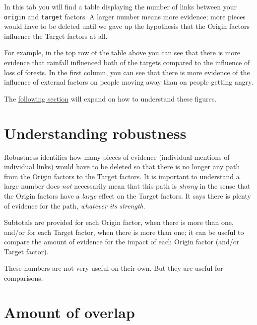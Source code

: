\documentclass[
]{book}
\begin{document}
In this tab you will find a table displaying the number of links between your \texttt{origin} and \texttt{target} factors. A larger number means more evidence; more pieces would have to be deleted until we gave up the hypothesis that the Origin factors influence the Target factors at all.

For example, in the top row of the table above you can see that there is more evidence that rainfall influenced both of the targets compared to the influence of loss of forests. In the first column, you can see that there is more evidence of the influence of external factors on people moving away than on people getting angry.

The \protect\hyperlink{howtoanalyseobustness}{following section} will expand on how to understand these figures.

\hypertarget{analysingrobustness}{%
\section{Understanding robustness}\label{analysingrobustness}}

Robustness identifies how many pieces of evidence (individual mentions of individual links) would have to be deleted so that there is no longer any path from the Origin factors to the Target factors. It is important to understand a large number does \emph{not} necessarily mean that this path is \emph{strong} in the sense that the Origin factors have a \emph{large} effect on the Target factors. It says there is plenty of evidence for the path, \emph{whatever its strength}.

Subtotals are provided for each Origin factor, when there is more than one, and/or for each Target factor, when there is more than one; it can be useful to compare the amount of evidence for the impact of each Origin factor (and/or Target factor).

These numbers are not very useful on their own. But they are useful for comparisons.

\hypertarget{amount-of-overlap}{%
\section{Amount of overlap}\label{amount-of-overlap}}
\end{document}
